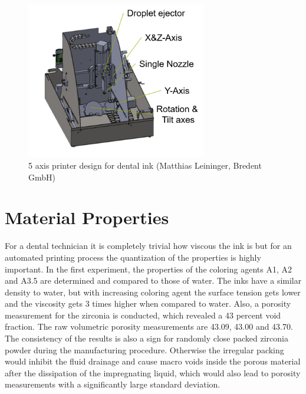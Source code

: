 \bigskip

\begin{figure}[H]
	\centering
	\includegraphics[width=0.7\textwidth]{grafiken/PrototypeText.png}
	\caption{5 axis printer design for dental ink (Matthias Leininger, Bredent GmbH)}
	\label{fig:Prototype}
\end{figure} 

\bigskip

\section{Material Properties}
For a dental technician it is completely trivial how viscous the ink is but for an automated printing  process the quantization of the properties is highly important. In the first experiment, the properties of the coloring agents A1, A2 and A3.5 are determined and compared to those of water. The inks have a similar density to water, but with increasing coloring agent the surface tension gets lower and the viscosity gets 3 times higher when compared to water. Also, a porosity measurement for the zirconia is conducted, which revealed a 43 percent void fraction. The raw volumetric porosity measurements are 43.09,	43.00 and 43.70. The consistency of the results is also a sign for randomly close packed zirconia powder during the manufacturing procedure. Otherwise the irregular packing would inhibit the fluid drainage and cause macro voids inside the porous material after the dissipation of the impregnating liquid, which would also lead to porosity measurements with a significantly large standard deviation. 

\bigskip

